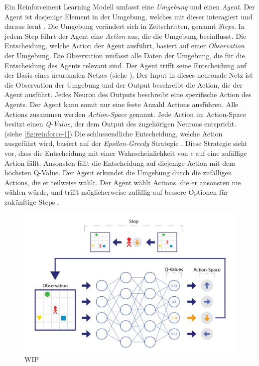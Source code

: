 Ein Reinforcement Learning Modell umfasst eine \emph{Umgebung} und einen
\emph{Agent}. Der Agent ist dasjenige Element in der Umgebung, welches mit
dieser interagiert und daraus lernt \cite[S. 53]{sutton_reinforcement_2014}. Die
Umgebung verändert sich in Zeitschritten, genannt \emph{Steps}. In jedem Step
führt der Agent eine \emph{Action} aus, die die Umgebung beeinflusst. Die
Entscheidung, welche Action der Agent ausführt, basiert auf einer
\emph{Observation} \cite[S. 2]{mnih_playing_2013} der Umgebung. Die
Observation umfasst alle Daten der Umgebung, die für die Entscheidung des Agents
relevant sind. Der Agent trifft seine Entscheidung auf der Basis eines
neuronalen Netzes (siehe ). Der Input in dieses neuronale
Netz ist die Observation der Umgebung und der Output beschreibt die Action, die
der Agent ausführt. Jedes Neuron des Outputs beschreibt eine spezifische Action
des Agents. Der Agent kann somit nur eine feste Anzahl Actions ausführen. Alle
Actions zusammen werden \emph{Action-Space} \cite[S.
67]{sutton_reinforcement_2014} genannt. Jede Action im Action-Space besitzt
einen \emph{Q-Value}, der dem Output des zugehörigen Neurons entspricht. (siehe
\autoref{fig:reinforce-1}) \cite{wang_deep_2021} Die schlussendliche Entscheidung, welche
Action ausgeführt wird, basiert auf der \emph{Epsilon-Greedy} Strategie \cite[S.
34]{sutton_reinforcement_2014}. Diese Strategie sieht vor, dass die Entscheidung
mit einer Wahrscheinlichkeit von $\epsilon$ auf eine zufällige Action fällt.
Ansonsten fällt die Entscheidung auf diejenige Action mit dem höchsten Q-Value.
Der Agent erkundet die Umgebung durch die zufälligen Actions, die er teilweise
wählt. Der Agent wählt Actions, die er ansonsten nie wählen würde, und trifft
möglicherweise zufällig auf bessere Optionen für zukünftige Steps
\cite{rajendra_koppula_exploration_nodate}.

\begin{figure}[!ht]
    \centering
    \includegraphics[width=\textwidth]{images/theorie/reinforce-1.png}
    \caption{WIP}
    \label{fig:reinforce-1}
\end{figure}

